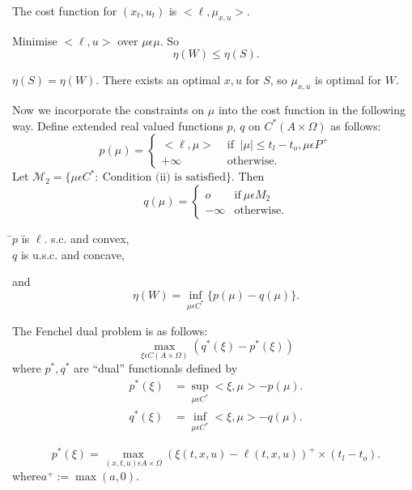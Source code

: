 \begin{Note}%
  The cost function for $(x_t, u_t)$ is $< \ell, \mu_{x, u}>$.
\end{Note}

\medskip
{}\pageoriginale 
Minimise $<\ell, u>$ over $\mu \epsilon \mu$. So
$$
\eta (W) \leq \eta (S).
$$

\begin{thm}%
  $\eta(S) = \eta (W)$. There exists an optimal $x, u$ for $S$, so
  $\mu_{x, u}$ is optimal for $W$.
\end{thm}

Now we incorporate the constraints on $\mu$ into the cost function in
the following way. Define extended real valued functions $p$, $q$ on
$C^*(A \times \Omega)$ as follows:
$$
p(\mu)= 
\begin{cases}
  < \ell, \mu > & \text{ if }~ |\mu| \leq t_l- t_o, \mu \epsilon P^+\\ 
  + \infty & \text{ otherwise}.
\end{cases}
$$
Let $\mathscr{M}_2= \{\mu \epsilon C^*: ~\text{Condition (ii) is
  satisfied}\}$. Then
$$
q(\mu)=
\begin{cases}
  o & \text{if}~ \mu \epsilon M_2\\
  - \infty & \text{otherwise}.
\end{cases}
$$

\begin{proposition}%
\begin{tabbing}
 \hspace{3.5cm}\=$p$ \= is $\ell$. s.c. and convex,\\
  \>$q$ \> is u.s.c. and concave,
\end{tabbing}
and 
$$
\eta(W) = \inf_{\mu \epsilon C^*} \{ p (\mu) - q(\mu)\}.
$$
\end{proposition}

The Fenchel dual problem is as follows:
\begin{equation*}
  \max_{\xi \epsilon C(A \times \Omega)} (q^* (\xi) - p^* (\xi)) \tag{D}
\end{equation*}
where $p^*, q^*$ are ``dual'' functionals defined by
\begin{align*}
  p^* (\xi) & = \sup_{\mu \epsilon C^*} < \xi, \mu > - p(\mu).\\
  q^* (\xi) & = \inf_{\mu \epsilon C^*} < \xi, \mu > - q (\mu ).
\end{align*}

\begin{proposition}%
  $$
  p^* (\xi) = \max_{(x, t, u) \epsilon A \times \Omega} (\xi (t, x, u)
  - \ell (t, x, u))^+ \times (t_l -t_o).
  $$
  where\pageoriginale $a^+ := \max(a, 0)$.
\end{proposition}

